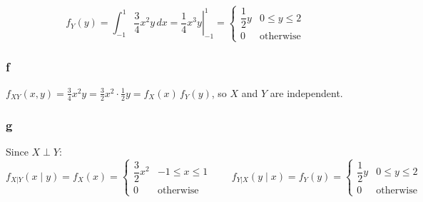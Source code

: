 \documentclass{article}
\begin{document}
\[
	f_Y(y) = \int_{-1}^1 \frac{3}{4} x^2 y \, dx = \left.\frac{1}{4} x^3 y \right|_{-1}^1 =
	\begin{cases} \dfrac{1}{2} y & 0 \leq y \leq 2 \\ 0 & \text{otherwise} \end{cases}
\]

\subsubsection*{f}

$f_{XY}(x,y) = \frac{3}{4}x^2 y = \frac{3}{2}x^2 \cdot \frac{1}{2}y = f_X(x)\,f_Y(y)$, so $X$ and $Y$ are independent.

\subsubsection*{g}

Since $X \perp Y$:
\[
	f_{X|Y}(x \mid y) = f_X(x) = \begin{cases} \dfrac{3}{2} x^2 & -1 \leq x \leq 1 \\ 0 & \text{otherwise} \end{cases}
	\qquad
	f_{Y|X}(y \mid x) = f_Y(y) = \begin{cases} \dfrac{1}{2} y & 0 \leq y \leq 2 \\ 0 & \text{otherwise} \end{cases}
\]
\end{document}
